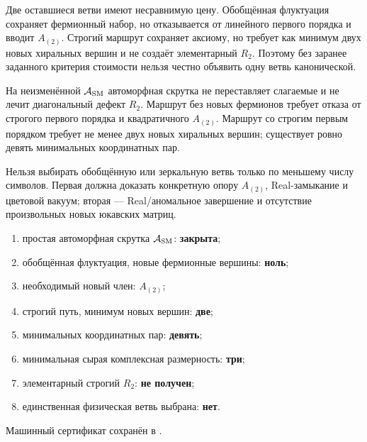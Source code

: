 Две оставшиеся ветви имеют несравнимую цену. Обобщённая флуктуация сохраняет
фермионный набор, но отказывается от линейного первого порядка и вводит
$A_{(2)}$. Строгий маршрут сохраняет аксиому, но требует как минимум двух
новых хиральных вершин и не создаёт элементарный $R_2$. Поэтому без заранее
заданного критерия стоимости нельзя честно объявить одну ветвь канонической.

\begin{theorem}
На неизменённой $\mathcal A_{\rm SM}$ автоморфная скрутка не переставляет
слагаемые и не лечит диагональный дефект $R_2$. Маршрут без новых фермионов
требует отказа от строгого первого порядка и квадратичного $A_{(2)}$.
Маршрут со строгим первым порядком требует не менее двух новых хиральных
вершин; существует ровно девять минимальных координатных пар.
\end{theorem}

\begin{nogocriterion}
Нельзя выбирать обобщённую или зеркальную ветвь только по меньшему числу
символов. Первая должна доказать конкретную опору $A_{(2)}$, Real-замыкание
и цветовой вакуум; вторая --- Real/аномальное завершение и отсутствие
произвольных новых юкавских матриц.
\end{nogocriterion}

\begin{protocol}
\begin{enumerate}
 \item простая автоморфная скрутка $\mathcal A_{\rm SM}$: \textbf{закрыта};
 \item обобщённая флуктуация, новые фермионные вершины: \textbf{ноль};
 \item необходимый новый член: \textbf{$A_{(2)}$};
 \item строгий путь, минимум новых вершин: \textbf{две};
 \item минимальных координатных пар: \textbf{девять};
 \item минимальная сырая комплексная размерность: \textbf{три};
 \item элементарный строгий $R_2$: \textbf{не получен};
 \item единственная физическая ветвь выбрана: \textbf{нет}.
\end{enumerate}
\end{protocol}

Машинный сертификат сохранён в
.

